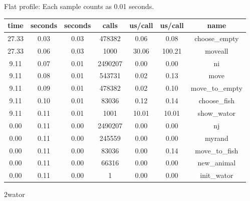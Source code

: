 \documentclass[a4paper,10pt]{article}
\begin{document}
Flat profile:
Each sample counts as 0.01 seconds.
\begin{center}
  \begin{tabular}{| c | c | c | c | c | c | c |}
    \hline
 time  &   seconds  &   seconds &    calls &  us/call &   us/call &   name \\ \hline    
 27.33 &      0.03 &     0.03 &   478382 &     0.06 &      0.08 &   choose\_empty \\ \hline
 27.33 &      0.06 & 0.03    & 1000    & 30.06    & 100.21     &      moveall \\ \hline
  9.11 &      0.07 &     0.01 &  2490207 &     0.00 &      0.00 &   ni \\ \hline
  9.11 &      0.08 &     0.01 &   543731 &     0.02 &      0.13 &   move \\ \hline
  9.11 &      0.09 &     0.01 &   478382 &     0.02 &      0.10 &   move\_to\_empty \\ \hline
  9.11 &      0.10 &     0.01 &    83036 &     0.12 &      0.14 &   choose\_fish \\ \hline
  9.11 &      0.11 &     0.01 &     1001 &    10.01 &     10.01 &   show\_wator \\ \hline
  0.00 &      0.11 &     0.00 &  2490207 &     0.00 &      0.00 &   nj \\ \hline
  0.00 &      0.11 &     0.00 &   245559 &     0.00 &      0.00 &   myrand \\ \hline
  0.00 &      0.11 &     0.00 &    83036 &     0.00 &      0.14 &   move\_to\_fish \\ \hline
  0.00 &      0.11 &     0.00 &    66316 &     0.00 &      0.00 &   new\_animal \\ \hline
  0.00 &      0.11 &     0.00 &        1 &     0.00 &      0.00 &   init\_wator \\ \hline
  \end{tabular}
\end{center}
  2wator
\end{document}
